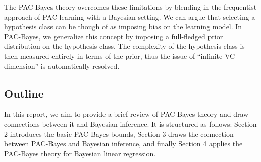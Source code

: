 The PAC-Bayes theory overcomes these limitations by blending in the frequentist
approach of PAC learning with a Bayesian setting. We can argue that selecting a
hypothesis class can be though of as imposing bias on the learning model. In
PAC-Bayes, we generalize this concept by imposing a full-fledged prior
distribution on the hypothesis class. The complexity of the hypothesis class is
then measured entirely in terms of the prior, thus the issue of ``infinite VC
dimension'' is automatically resolved.

\subsection{Outline}

In this report, we aim to provide a brief review of PAC-Bayes theory and draw
connections between it and Bayesian inference. It is structured as follows:
Section 2 introduces the basic PAC-Bayes bounds, Section 3 draws the connection
between PAC-Bayes and Bayesian inference, and finally Section 4 applies the
PAC-Bayes theory for Bayesian linear regression.
